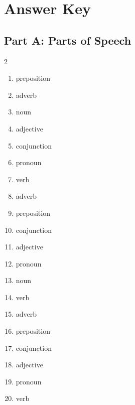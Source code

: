 \documentclass[11pt]{article}
\begin{document}
\newpage
\section*{Answer Key}

\subsection*{Part A: Parts of Speech}
\begin{multicols}{2}
\begin{enumerate}
  \item preposition
  \item adverb
  \item noun
  \item adjective
  \item conjunction
  \item pronoun
  \item verb
  \item adverb
  \item preposition
  \item conjunction
  \item adjective
  \item pronoun
  \item noun
  \item verb
  \item adverb
  \item preposition
  \item conjunction
  \item adjective
  \item pronoun
  \item verb
\end{enumerate}
\end{multicols}
\end{document}
